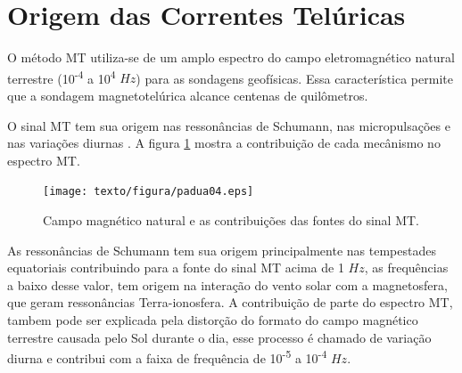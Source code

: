     \section{Origem das Correntes Telúricas}
    
        O método MT utiliza-se de um amplo espectro do campo eletromagnético natural terrestre (10\textsuperscript{-4} a 10\textsuperscript{4} $Hz$) para as sondagens geofísicas. Essa característica permite que  a sondagem magnetotelúrica alcance centenas de quilômetros.
        
        O sinal MT tem sua origem nas ressonâncias de Schumann, nas micropulsações e nas variações diurnas \cite{padua2004estudos}. A figura \ref{sinalmt} mostra a contribuição de cada mecânismo no espectro MT.
        
        \begin{figure}[H]
            \caption{Campo magnético natural e as contribuições das fontes do sinal MT.}
                \begin{center}
                    \texttt{[image: texto/figura/padua04.eps]}
                \end{center}
            \label{sinalmt}
        \end{figure}
        
        As ressonâncias de Schumann tem sua origem principalmente nas tempestades equatoriais contribuindo para a fonte do sinal MT acima de 1 $Hz$, as frequências a baixo desse valor, tem origem na interação do vento solar com a magnetosfera, que geram ressonâncias Terra-ionosfera. A contribuição de parte do espectro MT, tambem pode ser explicada pela distorção do formato do campo magnético terrestre causada pelo Sol durante o dia, esse processo é chamado de variação diurna e contribui com a faixa de frequência de 10\textsuperscript{-5} a 10\textsuperscript{-4} $Hz$. 
        
        
        
        
        
